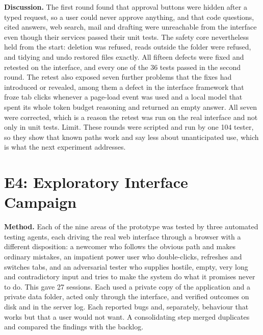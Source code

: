 \documentclass{FastFyp}
\begin{document}
\textbf{Discussion.} The first round found that approval buttons were hidden after a typed request, so a user could never approve anything, and that code questions, cited answers, web search, mail and drafting were unreachable from the interface even though their services passed their unit tests. The safety core nevertheless held from the start: deletion was refused, reads outside the folder were refused, and tidying and undo restored files exactly. All fifteen defects were fixed and retested on the interface, and every one of the 36 tests passed in the second round. The retest also exposed seven further problems that the fixes had introduced or revealed, among them a defect in the interface framework that froze tab clicks whenever a page-load event was used and a local model that spent its whole token budget reasoning and returned an empty answer. All seven were corrected, which is a reason the retest was run on the real interface and not only in unit tests. Limit. These rounds were scripted and run by one 104 tester, so they show that known paths work and say less about unanticipated use, which is what the next experiment addresses.

\section{E4: Exploratory Interface Campaign}
\label{sec:campaign}
\textbf{Method.} Each of the nine areas of the prototype was tested by three automated testing agents, each driving the real web interface through a browser with a different disposition: a newcomer who follows the obvious path and makes ordinary mistakes, an impatient power user who double-clicks, refreshes and switches tabs, and an adversarial tester who supplies hostile, empty, very long and contradictory input and tries to make the system do what it promises never to do. This gave 27 sessions. Each used a private copy of the application and a private data folder, acted only through the interface, and verified outcomes on disk and in the server log. Each reported bugs and, separately, behaviour that works but that a user would not want. A consolidating step merged duplicates and compared the findings with the backlog.
\end{document}
